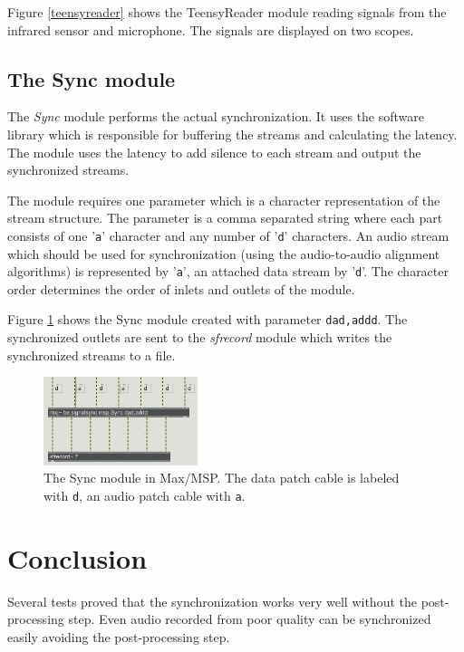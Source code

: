 \documentclass[twocolumn]{phdsymp} %
\begin{document}
Figure \ref{teensyreader} shows the TeensyReader module reading signals from the infrared sensor and microphone. The signals are displayed on two scopes.


\subsection{The Sync module}

The \emph{Sync} module performs the actual synchronization. It uses the software library which is responsible for buffering the streams and calculating the latency. The module uses the latency to add silence to each stream and output the synchronized streams.

The module requires one parameter which is a character representation of the stream structure. The parameter is a comma separated string where each part consists of one '\texttt{a}' character and any number of '\texttt{d}' characters. An audio stream which should be used for synchronization (using the audio-to-audio alignment algorithms) is represented by '\texttt{a}', an attached data stream by '\texttt{d}'. The character order determines the order of inlets and outlets of the module.

Figure \ref{sync} shows the Sync module created with parameter \texttt{dad,addd}. The synchronized outlets are sent to the \emph{sfrecord} module which writes the synchronized streams to a file.

\begin{figure}[ht]
	\begin{center}
		\includegraphics[width=0.4\textwidth]{../boek/figuren/syncwrite.png}
		\caption{\label{sync}The Sync module in Max/MSP. The data patch cable is labeled with \texttt{d}, an audio patch cable with \texttt{a}.}
	\end{center}
\end{figure}

\section{Conclusion}
Several tests proved that the synchronization works very well without the post-processing step. Even audio recorded from poor quality can be synchronized easily avoiding the post-processing step. 



\end{document}
